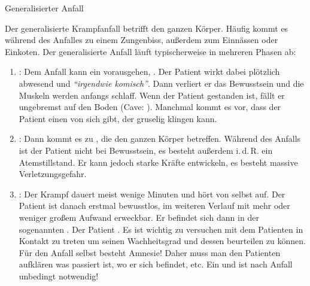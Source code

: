\TextSlide
{Generalisierter Anfall}
{%
\label{topic:krampfanfall-generalisierter}
Der generalisierte Krampfanfall  betrifft den ganzen Körper. Häufig kommt es während des Anfalles zu einem Zungenbiss,
außerdem zum Einnässen oder Einkoten. 
Der generalisierte Anfall läuft typischerweise in mehreren Phasen ab:

\begin{enumerate}
  \item {}:
  Dem Anfall kann ein
  vorausgehen, . Der Patient wirkt
  dabei plötzlich abwesend und \emph{\enquote{irgendwie komisch}}.
  Dann verliert er das Bewusstsein und die Muskeln werden
  anfangs schlaff. Wenn der Patient gestanden ist, fällt er
  ungebremst auf den Boden (Cave: ).
  Manchmal kommt es vor, dass der Patient einen
   von sich gibt, der
  gruselig klingen kann. 
  
  \item {}:
  Dann kommt es zu
  ,
  die den ganzen Körper betreffen. Während des Anfalls ist der
  Patient nicht bei Bewusstsein, es besteht außerdem i.\,d.\,R.
  ein Atemstillstand. Er kann jedoch starke Kräfte entwickeln, es
  besteht massive
  Verletzungsgefahr.
  
  \item {}:
  Der Krampf dauert meist wenige Minuten und hört von selbst
  auf. Der Patient ist danach erstmal bewusstlos, im weiteren
  Verlauf mit mehr oder weniger großem Aufwand erweckbar. Er
  befindet sich dann in der sogenannten
  .
  Der Patient . Es ist
  wichtig zu versuchen mit dem Patienten in Kontakt zu treten
  um seinen Wachheitsgrad und dessen
   beurteilen zu können. Für den Anfall selbst besteht
  Amnesie! Daher muss man den Patienten aufklären was passiert
  ist, wo er sich befindet, etc. Ein  und
   ist nach \underline{} Anfall
  unbedingt notwendig! 
\end{enumerate}


}
